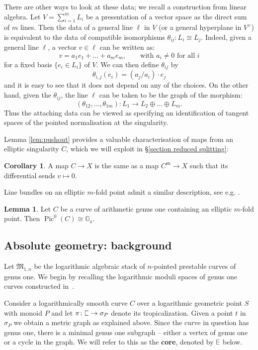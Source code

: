 \documentclass[11pt]{amsart}
\DeclareRobustCommand{\plE}{\text{\reflectbox{$\exists$}}}
\newcommand{\plC}{\scalebox{0.8}[1.3]{$\sqsubset$}}
\renewcommand{\to}{\rightarrow}
\theoremstyle{definition}
\newtheorem{lemma}[thm]{Lemma}
\newtheorem{cor}[thm]{Corollary}
\theoremstyle{definition}
\begin{document}
There are other ways to look at these data; we recall a construction from linear algebra. Let $V=\sum_{i=1}^mL_i$ be a presentation of a vector space as the direct sum of $m$ lines. Then the data of a general line $\ell$ in $V$ (or a general hyperplane in $V^\vee$) is equivalent to the data of compatible isomorphisms $\theta_{ij} \colon L_i \cong L_j$. Indeed, given a general line $\ell$, a vector $v\in\ell$ can be written as:
\[v=a_1e_1+\ldots+a_me_m,\qquad \text{with $a_i\neq 0$ for all $i$}\]
for a fixed basis $\{e_i\in L_i\}$ of $V$. We can then define $\theta_{ij}$ by
\[\theta_{i,j}(e_i)=(a_j/a_i)\cdot e_j\]
and it is easy to see that it does not depend on any of the choices. On the other hand, given the $\theta_{ij}$, the line $\ell$ can be taken to be the graph of the morphism:
\[(\theta_{12},\ldots,\theta_{1m})\colon L_1\to L_2\oplus\ldots\oplus L_m.\]
Thus the attaching data can be viewed as specifying an identification of tangent spaces of the pointed normalisation at the singularity.

Lemma \ref{lem:pushout} provides a valuable characterisation of maps from an elliptic singularity $C$, which we will exploit in \S \ref{section reduced splitting}:
\begin{cor}\label{cor:maps_from_elliptic_sing}
 A map $C\to X$ is the same as a map $C^\text{sn}\to X$ such that its differential sends $v \mapsto 0$.
\end{cor}
\noindent Line bundles on an elliptic $m$-fold point admit a similar description, see e.g. \cite[Lemma 7.5.12]{LiuQ}.
\begin{lemma}\label{lem:PicE}
 Let $C$ be a curve of arithmetic genus one containing an elliptic $m$-fold point. Then $\operatorname{Pic}^0(C)\cong\mathbb G_{\text{a}}$.
\end{lemma}


\subsection{Absolute geometry: background} Let $\mathfrak M_{1,n}$ be the logarithmic algebraic stack of $n$-pointed prestable curves of genus one. We begin by recalling the logarithmic moduli spaces of genus one curves constructed in~\cite[\S 2 \& \S 4]{RSPW}. 

Consider a logarithmically smooth curve $C$ over a logarithmic geometric point $S$ with monoid $P$ and let $\pi\colon \plC\to \sigma_P$ denote its tropicalization. Given a point $t$ in $\sigma_P$ we obtain a metric graph as explained above. Since the curve in question has genus one, there is a minimal genus one subgraph -- either a vertex of genus one or a cycle in the graph. We will refer to this as the \textbf{core}, denoted by $\plE$ below.
\end{document}
